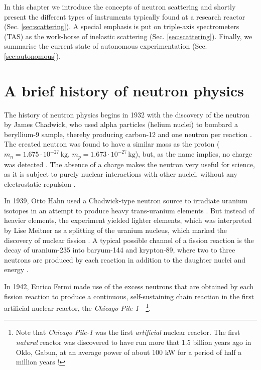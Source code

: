 In this chapter we introduce the concepts of neutron scattering and shortly present the different types of instruments typically found at a research reactor (Sec. \ref{sec:scattering}). A special emphasis is put on triple-axis spectrometers (TAS) as the work-horse of inelastic scattering (Sec. \ref{sec:scattering}). Finally, we summarise the current state of autonomous experimentation (Sec. \ref{sec:autonomous}).



\section{A brief history of neutron physics \label{sec:neutrons}}

The history of neutron physics begins in 1932 with the discovery of the neutron by James Chadwick, who used alpha particles (helium nuclei) to bombard a beryllium-9 sample, thereby producing carbon-12 and one neutron per reaction \cite[p. 1]{Jacrot2021}. The created neutron was found to have a similar mass as the proton ($m_n = 1.675\cdot10^{-27}\,\mathrm{kg}$, $m_p = 1.673\cdot10^{-27}\,\mathrm{kg}$), but, as the name implies, no charge was detected \cite[p. 2]{Squires2012}. The absence of a charge makes the neutron very useful for science, as it is subject to purely nuclear interactions with other nuclei, without any electrostatic repulsion \cite[p. 1]{Squires2012}.

In 1939, Otto Hahn used a Chadwick-type neutron source to irradiate uranium isotopes in an attempt to produce heavy trans-uranium elements \cite{wiki_fission}. But instead of heavier elements, the experiment yielded lighter elements, which was interpreted by Lise Meitner as a splitting of the uranium nucleus, which marked the discovery of nuclear fission \cite{wiki_fission}. A typical possible channel of a fission reaction is the decay of uranium-235 into baryum-144 and krypton-89, where two to three neutrons are produced by each reaction in addition to the daughter nuclei and energy \cite{wiki_fission}.

In 1942, Enrico Fermi made use of the excess neutrons that are obtained by each fission reaction to produce a continuous, self-sustaining chain reaction in the first artificial nuclear reactor, the \textit{Chicago Pile-1}~\cite[p.1]{Jacrot2021}~\footnote{Note that \textit{Chicago Pile-1} was the first \textit{artificial} nuclear reactor. The first \textit{natural} reactor was discovered to have run more that 1.5 billion years ago in Oklo, Gabun, at an average power of about 100 kW for a period of half a million years \cite{wiki_oklo}!}.

